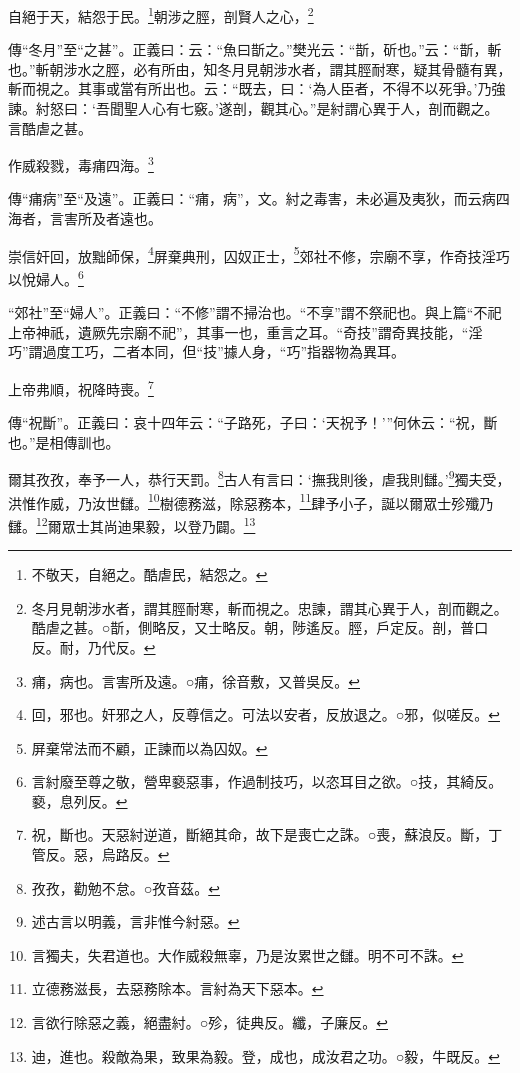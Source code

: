 自絕于天，結怨于民。\footnote{不敬天，自絕之。酷虐民，結怨之。}朝涉之脛，剖賢人之心，\footnote{冬月見朝涉水者，謂其脛耐寒，斬而視之。忠諫，謂其心異于人，剖而觀之。酷虐之甚。○斮，側略反，又士略反。朝，陟遙反。脛，戶定反。剖，普口反。耐，乃代反。}

{\noindent\zhuan{}\fzbyks 傳“冬月”至“之甚”。正義曰：云：“魚曰斮之。”樊光云：“斮，斫也。”云：“斮，斬也。”斬朝涉水之脛，必有所由，知冬月見朝涉水者，謂其脛耐寒，疑其骨髓有異，斬而視之。其事或當有所出也。云：“既去，曰：‘為人臣者，不得不以死爭。’乃強諫。紂怒曰：‘吾聞聖人心有七竅。’遂剖，觀其心。”是紂謂心異于人，剖而觀之。言酷虐之甚。 \par}

作威殺戮，毒痡四海。\footnote{痡，病也。言害所及遠。○痡，徐音敷，又普吳反。}

{\noindent\zhuan{}\fzbyks 傳“痡病”至“及遠”。正義曰：“痡，病”，文。紂之毒害，未必遍及夷狄，而云病四海者，言害所及者遠也。 \par}

崇信奸回，放黜師保，\footnote{回，邪也。奸邪之人，反尊信之。可法以安者，反放退之。○邪，似嗟反。}屏棄典刑，囚奴正士，\footnote{屏棄常法而不顧，正諫而以為囚奴。}郊社不修，宗廟不享，作奇技淫巧以悅婦人。\footnote{言紂廢至尊之敬，營卑褻惡事，作過制技巧，以恣耳目之欲。○技，其綺反。褻，息列反。}

{\noindent\shu{}\fzkt “郊社”至“婦人”。正義曰：“不修”謂不掃治也。“不享”謂不祭祀也。與上篇“不祀上帝神祇，遺厥先宗廟不祀”，其事一也，重言之耳。“奇技”謂奇異技能，“淫巧”謂過度工巧，二者本同，但“技”據人身，“巧”指器物為異耳。 \par}

上帝弗順，祝降時喪。\footnote{祝，斷也。天惡紂逆道，斷絕其命，故下是喪亡之誅。○喪，蘇浪反。斷，丁管反。惡，烏路反。}

{\noindent\zhuan{}\fzbyks 傳“祝斷”。正義曰：哀十四年云：“子路死，子曰：‘天祝予！’”何休云：“祝，斷也。”是相傳訓也。 \par}

爾其孜孜，奉予一人，恭行天罰。\footnote{孜孜，勸勉不怠。○孜音茲。}古人有言曰：‘撫我則後，虐我則讎。’\footnote{述古言以明義，言非惟今紂惡。}獨夫受，洪惟作威，乃汝世讎。\footnote{言獨夫，失君道也。大作威殺無辜，乃是汝累世之讎。明不可不誅。}樹德務滋，除惡務本，\footnote{立德務滋長，去惡務除本。言紂為天下惡本。}肆予小子，誕以爾眾士殄殲乃讎。\footnote{言欲行除惡之義，絕盡紂。○殄，徒典反。纖，子廉反。}爾眾士其尚迪果毅，以登乃闢。\footnote{迪，進也。殺敵為果，致果為毅。登，成也，成汝君之功。○毅，牛既反。}

